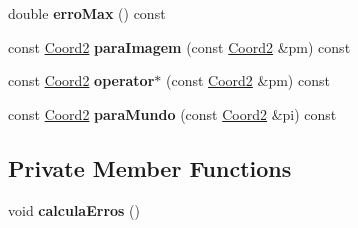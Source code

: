 \begin{DoxyCompactItemize}
\item 
double {\bfseries erro\+Max} () const \hypertarget{classHomografia_a4750b435c729c415de61885d227998ed}{}\label{classHomografia_a4750b435c729c415de61885d227998ed}

\item 
const \hyperlink{structCoord2}{Coord2} {\bfseries para\+Imagem} (const \hyperlink{structCoord2}{Coord2} \&pm) const \hypertarget{classHomografia_a5db87a04b6b02cb6896c376461f7905b}{}\label{classHomografia_a5db87a04b6b02cb6896c376461f7905b}

\item 
const \hyperlink{structCoord2}{Coord2} {\bfseries operator$\ast$} (const \hyperlink{structCoord2}{Coord2} \&pm) const \hypertarget{classHomografia_a84492a455c11ebf77f04a7b2612e53c4}{}\label{classHomografia_a84492a455c11ebf77f04a7b2612e53c4}

\item 
const \hyperlink{structCoord2}{Coord2} {\bfseries para\+Mundo} (const \hyperlink{structCoord2}{Coord2} \&pi) const \hypertarget{classHomografia_a467546d6795fd05d2117e203995e613e}{}\label{classHomografia_a467546d6795fd05d2117e203995e613e}

\end{DoxyCompactItemize}
\subsection*{Private Member Functions}
\begin{DoxyCompactItemize}
\item 
void {\bfseries calcula\+Erros} ()\hypertarget{classHomografia_ab6aa52f09141327f93ad613db4ce20b4}{}\label{classHomografia_ab6aa52f09141327f93ad613db4ce20b4}

\end{DoxyCompactItemize}

